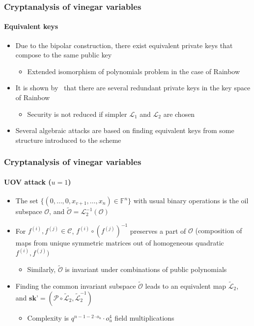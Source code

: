 \documentclass[12pt]{beamer}
\begin{document}
\begin{frame}
  \frametitle{Cryptanalysis of vinegar variables}
  \framesubtitle{Equivalent keys}
  \begin{itemize}
    \item Due to the bipolar construction, there exist equivalent private keys
        that compose to the same public key
    \begin{itemize}
      \item Extended isomorphism of polynomials problem in the case of Rainbow
    \end{itemize}
    \item It is shown by~\cite{Wolf:200511} that there are several redundant
        private keys in the key space of Rainbow
    \begin{itemize}
      \item Security is not reduced if simpler $\mathcal{L}_{1}$ and
          $\mathcal{L}_{2}$ are chosen
    \end{itemize}
    \item Several algebraic attacks are based on finding equivalent keys from
        some structure introduced to the scheme
  \end{itemize}
\end{frame}


\begin{frame}
  \frametitle{Cryptanalysis of vinegar variables}
  \framesubtitle{UOV attack ($u = 1$)}
  \begin{itemize}
    \item The set $\{ (0, \dots, 0, x_{v + 1}, \dots, x_{n}) \in
        \mathbb{F}^{n} \}$ with usual binary operations is the oil subspace
          $\mathcal{O}$, and $\widetilde{\mathcal{O}}
          = \mathcal{L}_{2}^{-1}(\mathcal{O})$
    \item For $f^{(i)}, f^{(j)} \in \mathcal{C}$,
        $f^{(i)} \circ (f^{(j)})^{-1}$ preserves a part of $\mathcal{O}$
          {\tiny (composition of maps from unique symmetric matrices
          out of homogeneous quadratic $f^{(i)}, f^{(j)})$}
    \begin{itemize}[itemsep=1pt]
      \item Similarly, $\widetilde{\mathcal{O}}$ is invariant under
          combinations of public polynomials
    \end{itemize}
    \item Finding the common invariant subspace $\widetilde{\mathcal{O}}$
        leads to an equivalent map $\widetilde{\mathcal{L}}_{2}$, and
          $\textbf{sk'} = (\mathcal{P} \circ \widetilde{\mathcal{L}}_{2},
          \widetilde{\mathcal{L}}_{2}^{-1})$
    \begin{itemize}
      \item Complexity is $q^{n - 1 - 2 \cdot o_{u}} \cdot o_{u}^{4}$ field
          multiplications
    \end{itemize}
  \end{itemize}
\end{frame}
\end{document}
